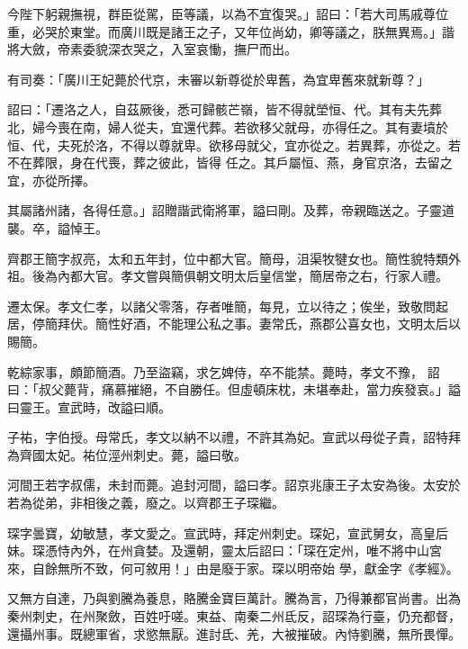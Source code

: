\begin{pinyinscope}
 今陛下躬親撫視，群臣從駕，臣等議，以為不宜復哭。」詔曰：「若大司馬戚尊位重，必哭於東堂。而廣川既是諸王之子，又年位尚幼，卿等議之，朕無異焉。」諧將大斂，帝素委貌深衣哭之，入室哀慟，撫尸而出。



 有司奏：「廣川王妃薨於代京，未審以新尊從於卑舊，為宜卑舊來就新尊？」



 詔曰：「遷洛之人，自茲厥後，悉可歸骸芒嶺，皆不得就塋恒、代。其有夫先葬北，婦今喪在南，婦人從夫，宜還代葬。若欲移父就母，亦得任之。其有妻墳於恒、代，夫死於洛，不得以尊就卑。欲移母就父，宜亦從之。若異葬，亦從之。若不在葬限，身在代喪，葬之彼此，皆得
 任之。其戶屬恒、燕，身官京洛，去留之宜，亦從所擇。



 其屬諸州諸，各得任意。」詔贈諧武衛將軍，謚曰剛。及葬，帝親臨送之。子靈道襲。卒，謚悼王。



 齊郡王簡字叔亮，太和五年封，位中都大官。簡母，沮渠牧犍女也。簡性貌特類外祖。後為內都大官。孝文嘗與簡俱朝文明太后皇信堂，簡居帝之右，行家人禮。



 遷太保。孝文仁孝，以諸父零落，存者唯簡，每見，立以待之；俟坐，致敬問起居，停簡拜伏。簡性好酒，不能理公私之事。妻常氏，燕郡公喜女也，文明太后以賜簡。



 乾綜家事，頗節簡酒。乃至盜竊，求乞婢侍，卒不能禁。薨時，孝文不豫，
 詔曰：「叔父薨背，痛慕摧絕，不自勝任。但虛頓床枕，未堪奉赴，當力疾發哀。」謚曰靈王。宣武時，改謚曰順。



 子祐，字伯授。母常氏，孝文以納不以禮，不許其為妃。宣武以母從子貴，詔特拜為齊國太妃。祐位涇州刺史。薨，謚曰敬。



 河間王若字叔儒，未封而薨。追封河間，謚曰孝。詔京兆康王子太安為後。太安於若為從弟，非相後之義，廢之。以齊郡王子琛繼。



 琛字曇寶，幼敏慧，孝文愛之。宣武時，拜定州刺史。琛妃，宣武舅女，高皇后妹。琛憑恃內外，在州貪婪。及還朝，靈太后詔曰：「琛在定州，唯不將中山宮來，自餘無所不致，何可敘用！」由是廢于家。琛以明帝始
 學，獻金字《孝經》。



 又無方自達，乃與劉騰為養息，賂騰金寶巨萬計。騰為言，乃得兼都官尚書。出為秦州刺史，在州聚斂，百姓吁嗟。東益、南秦二州氐反，詔琛為行臺，仍充都督，還攝州事。既總軍省，求慾無厭。進討氐、羌，大被摧破。內恃劉騰，無所畏憚。




\end{pinyinscope}
